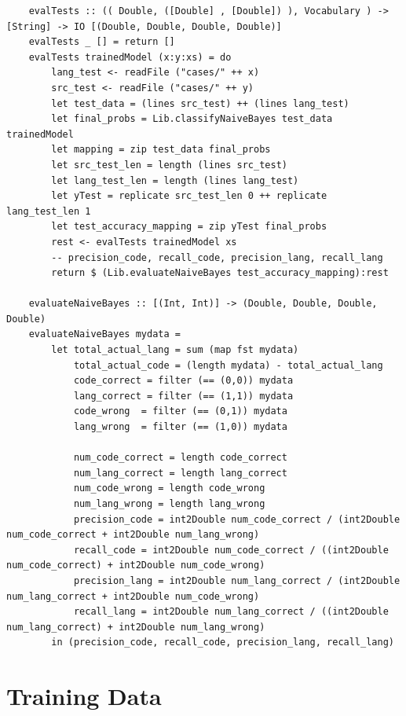 \documentclass[12pt]{scrreprt}
\begin{document}
\begin{verbatim}
    evalTests :: (( Double, ([Double] , [Double]) ), Vocabulary ) -> [String] -> IO [(Double, Double, Double, Double)]
    evalTests _ [] = return []
    evalTests trainedModel (x:y:xs) = do
        lang_test <- readFile ("cases/" ++ x)
        src_test <- readFile ("cases/" ++ y)
        let test_data = (lines src_test) ++ (lines lang_test)
        let final_probs = Lib.classifyNaiveBayes test_data trainedModel
        let mapping = zip test_data final_probs
        let src_test_len = length (lines src_test)
        let lang_test_len = length (lines lang_test)
        let yTest = replicate src_test_len 0 ++ replicate lang_test_len 1
        let test_accuracy_mapping = zip yTest final_probs
        rest <- evalTests trainedModel xs
        -- precision_code, recall_code, precision_lang, recall_lang
        return $ (Lib.evaluateNaiveBayes test_accuracy_mapping):rest

    evaluateNaiveBayes :: [(Int, Int)] -> (Double, Double, Double, Double)
    evaluateNaiveBayes mydata = 
        let total_actual_lang = sum (map fst mydata)
            total_actual_code = (length mydata) - total_actual_lang
            code_correct = filter (== (0,0)) mydata
            lang_correct = filter (== (1,1)) mydata
            code_wrong  = filter (== (0,1)) mydata
            lang_wrong  = filter (== (1,0)) mydata
    
            num_code_correct = length code_correct
            num_lang_correct = length lang_correct
            num_code_wrong = length code_wrong
            num_lang_wrong = length lang_wrong
            precision_code = int2Double num_code_correct / (int2Double num_code_correct + int2Double num_lang_wrong)
            recall_code = int2Double num_code_correct / ((int2Double num_code_correct) + int2Double num_code_wrong)
            precision_lang = int2Double num_lang_correct / (int2Double num_lang_correct + int2Double num_code_wrong)
            recall_lang = int2Double num_lang_correct / ((int2Double num_lang_correct) + int2Double num_lang_wrong)
        in (precision_code, recall_code, precision_lang, recall_lang)
   \end{verbatim}
 
\section{Training Data}
\end{document}
